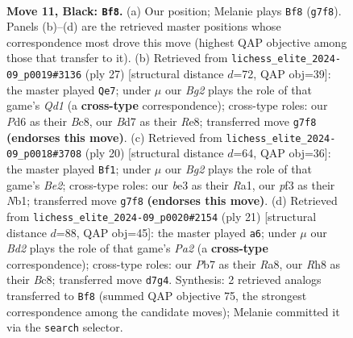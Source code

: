 \documentclass[11pt]{article}
\begin{document}
\begin{figure}[p]\centering
\begin{subfigure}{0.46\textwidth}\centering
\resizebox{\linewidth}{!}{%
\newchessgame
\chessboard[
  setfen={r2qk2r/pp1bppbp/n2p1np1/8/3NP3/2N1BP2/PPP2QPP/2K1RB1R b kq - 8 11},
  showmover=false,
  pgfstyle=straightmove, color=movearrow, markmove={g7-f8}
]}
\caption{}
\end{subfigure}\hfill
\begin{subfigure}{0.46\textwidth}\centering
\resizebox{\linewidth}{!}{%
\newchessgame
\chessboard[
  setfen={r1bqr1k1/pp3pp1/2pb1nnp/4p3/P3P3/2P1NNP1/1PQ2PBP/R1B1R1K1 b - - 0 14},
  showmover=false,
  pgfstyle=straightmove, color=movearrow, markmove={d8-e7}
]}
\caption{}
\end{subfigure}
\\[4pt]
\begin{subfigure}{0.46\textwidth}\centering
\resizebox{\linewidth}{!}{%
\newchessgame
\chessboard[
  setfen={r1bq1r1k/ppp3bp/2n2pp1/3np3/8/2PP1N2/PP2BPPP/RNBQR1K1 w - - 2 11},
  showmover=false,
  pgfstyle=straightmove, color=movearrow, markmove={e2-f1}
]}
\caption{}
\end{subfigure}\hfill
\begin{subfigure}{0.46\textwidth}\centering
\resizebox{\linewidth}{!}{%
\newchessgame
\chessboard[
  setfen={r1bq1rk1/p2nppbp/2p2np1/1p6/3PP3/2N2N1P/PPQ1BPP1/R1B2RK1 b - - 1 11},
  showmover=false,
  pgfstyle=straightmove, color=movearrow, markmove={a7-a6}
]}
\caption{}
\end{subfigure}
\caption{\textbf{Move 11, Black: \texttt{Bf8}.} (a) Our position; Melanie plays \texttt{Bf8} (\texttt{g7f8}). Panels (b)--(d) are the retrieved master positions whose correspondence most drove this move (highest QAP objective among those that transfer to it). (b) Retrieved from \texttt{lichess\_elite\_2024-09\_p0019\#3136} (ply 27) [structural distance $d$=72, QAP obj=39]: the master played \texttt{Qe7}; under $\mu$ our \emph{Bg2} plays the role of that game's \emph{Qd1} (a \textbf{cross-type} correspondence); cross-type roles: our \emph{P}d6 as their \emph{B}c8, our \emph{B}d7 as their \emph{R}e8; transferred move \texttt{g7f8} \textbf{(endorses this move)}. (c) Retrieved from \texttt{lichess\_elite\_2024-09\_p0018\#3708} (ply 20) [structural distance $d$=64, QAP obj=36]: the master played \texttt{Bf1}; under $\mu$ our \emph{Bg2} plays the role of that game's \emph{Be2}; cross-type roles: our \emph{b}e3 as their \emph{R}a1, our \emph{p}f3 as their \emph{N}b1; transferred move \texttt{g7f8} \textbf{(endorses this move)}. (d) Retrieved from \texttt{lichess\_elite\_2024-09\_p0020\#2154} (ply 21) [structural distance $d$=88, QAP obj=45]: the master played \texttt{a6}; under $\mu$ our \emph{Bd2} plays the role of that game's \emph{Pa2} (a \textbf{cross-type} correspondence); cross-type roles: our \emph{P}b7 as their \emph{R}a8, our \emph{R}h8 as their \emph{B}c8; transferred move \texttt{d7g4}. Synthesis: 2 retrieved analogs transferred to \texttt{Bf8} (summed QAP objective 75, the strongest correspondence among the candidate moves); Melanie committed it via the \texttt{search} selector.}
\label{fig:thought-m21}
\end{figure}
\end{document}
